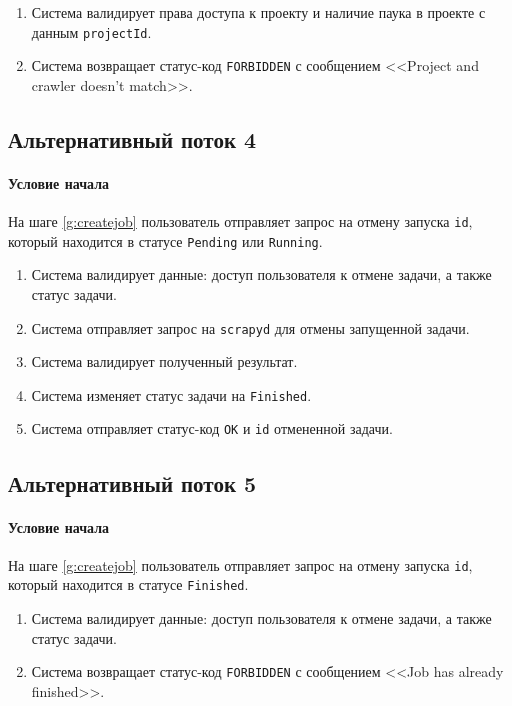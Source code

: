 \documentclass[a4paper,12pt]{article}
\begin{document}
\begin{enumerate}
    \item Система валидирует права доступа к проекту и наличие паука в проекте с данным \texttt{projectId}.
    \item Система возвращает статус-код \texttt{FORBIDDEN} с сообщением <<Project and crawler doesn't match>>.
\end{enumerate}

\subsection*{Альтернативный поток 4} 
\paragraph*{Условие начала} На шаге \ref{g:createjob} пользователь отправляет запрос на отмену запуска \texttt{id}, который находится в статусе \texttt{Pending} или \texttt{Running}.

\begin{enumerate}
    \item Система валидирует данные: доступ пользователя к отмене задачи, а также статус задачи.
    \item Система отправляет запрос на \texttt{scrapyd} для отмены запущенной задачи.
    \item Система валидирует полученный результат.
    \item Система изменяет статус задачи на \texttt{Finished}.
    \item Система отправляет статус-код \texttt{OK} и \texttt{id} отмененной задачи.
\end{enumerate}


\subsection*{Альтернативный поток 5} 
\paragraph*{Условие начала} На шаге \ref{g:createjob} пользователь отправляет запрос на отмену запуска \texttt{id}, который находится в статусе \texttt{Finished}.

\begin{enumerate}
    \item Система валидирует данные: доступ пользователя к отмене задачи, а также статус задачи.
    \item Система возвращает статус-код \texttt{FORBIDDEN} с сообщением <<Job has already finished>>.
\end{enumerate}
\end{document}
